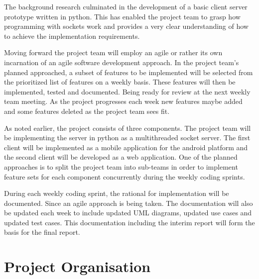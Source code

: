 \documentclass[11pt,a4paper]{article}
\begin{document}
The background research culminated in the development of a basic client server prototype written in python. This has enabled the project team to grasp how programming with sockets work and provides a very clear understanding of how to achieve the implementation requirements.


Moving forward the project team will employ an agile or rather its own incarnation of an agile software development approach. In the project team’s planned approached, a subset of features to be implemented will be selected from the prioritized list of features on a weekly basis. These features will then be implemented, tested and documented. Being ready for review at the next weekly team meeting. As the project progresses each week new features maybe added and some features deleted as the project team sees fit.


As noted earlier, the project consists of three components. The project team will be implementing the server in python as a multithreaded socket server. The first client will be implemented as a mobile application for the android platform and the second client will be developed as a web application. One of the planned approaches is to split the project team into sub-teams in order to implement feature sets for each component concurrently during the weekly coding sprints. 


During each weekly coding sprint, the rational for implementation will be documented. Since an agile approach is being taken. The documentation will also be updated each week to include updated UML diagrams, updated use cases and updated test cases. This documentation including the interim report will form the basis for the final report.



\section{Project Organisation}
\end{document}
